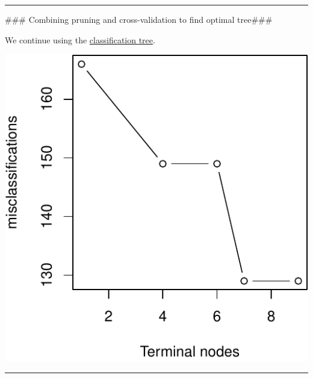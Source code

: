 \documentclass[]{article}
\newenvironment{Shaded}{\begin{snugshade}}{\end{snugshade}}
\newcommand{\DataTypeTok}[1]{\textcolor[rgb]{0.13,0.29,0.53}{#1}}
\newcommand{\DecValTok}[1]{\textcolor[rgb]{0.00,0.00,0.81}{#1}}
\newcommand{\KeywordTok}[1]{\textcolor[rgb]{0.13,0.29,0.53}{\textbf{#1}}}
\newcommand{\NormalTok}[1]{#1}
\newcommand{\OperatorTok}[1]{\textcolor[rgb]{0.81,0.36,0.00}{\textbf{#1}}}
\newcommand{\StringTok}[1]{\textcolor[rgb]{0.31,0.60,0.02}{#1}}
\begin{document}
\begin{center}\rule{0.5\linewidth}{\linethickness}\end{center}

\#\#\# Combining pruning and cross-validation to find optimal tree\#\#\#

We continue using the \protect\hyperlink{classtree2}{classification
tree}.

\begin{Shaded}
\end{Shaded}

\includegraphics{8Trees_files/figure-latex/unnamed-chunk-18-1.pdf}

\begin{center}\rule{0.5\linewidth}{\linethickness}\end{center}
\end{document}

